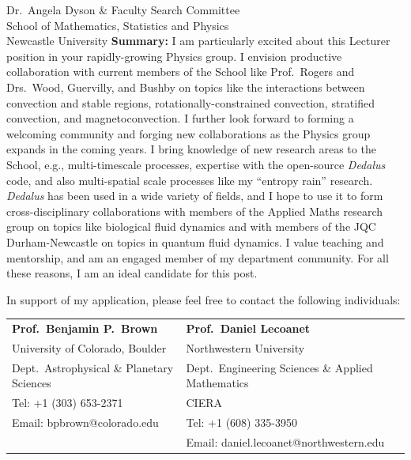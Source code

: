 \documentclass[12pt, a4paper]{letter}
\begin{document}
\begin{letter}{
        Dr.~Angela Dyson \& Faculty Search Committee \\
        School of Mathematics, Statistics and Physics \\
        Newcastle University}
    \textbf{Summary: } I am particularly excited about this Lecturer position in your rapidly-growing Physics group.
    I envision productive collaboration with current members of the School like Prof.~Rogers and Drs.~Wood, Guervilly, and Bushby on topics like the interactions between convection and stable regions, rotationally-constrained convection, stratified convection, and magnetoconvection.
    I further look forward to forming a welcoming community and forging new collaborations as the Physics group expands in the coming years.    
    I bring knowledge of new research areas to the School, e.g., multi-timescale processes, expertise with the open-source \emph{Dedalus} code, and also multi-spatial scale processes like my ``entropy rain'' research.
    \emph{Dedalus} has been used in a wide variety of fields, and I hope to use it to form cross-disciplinary collaborations with members of the Applied Maths research group on topics like biological fluid dynamics and with members of the JQC Durham-Newcastle on topics in quantum fluid dynamics.
    I value teaching and mentorship, and am an engaged member of my department community.
    For all these reasons, I am an ideal candidate for this post.

    In support of my application, please feel free to contact the following individuals:

    \footnotesize
    \begin{tabular}{ll}
        \textbf{Prof.~Benjamin P.~Brown}                        &\hspace{0.25in} \textbf{Prof.~Daniel Lecoanet}                     \\
        University of Colorado, Boulder                         &\hspace{0.25in} Northwestern University    \\
        \hspace{0.2in}Dept.~Astrophysical \& Planetary Sciences &\hspace{0.45in} Dept.~Engineering Sciences \& Applied Mathematics \\
        Tel: +1 (303) 653-2371                                    &\hspace{0.45in} CIERA                          \\
        Email: bpbrown@colorado.edu                             &\hspace{0.25in} Tel: +1 (608) 335-3950 \\
                                                                &\hspace{0.25in} Email: daniel.lecoanet@northwestern.edu             \\


\end{tabular}
\end{letter}
\end{document}
